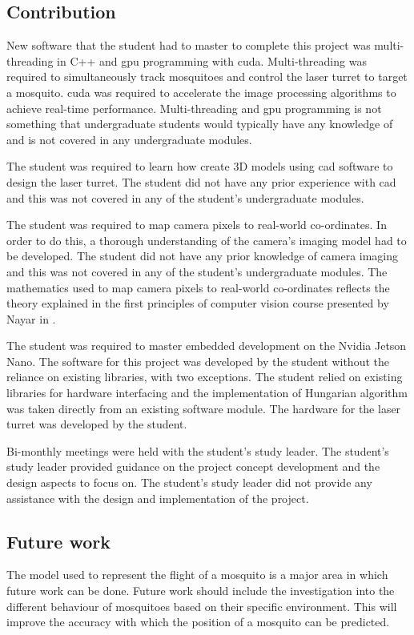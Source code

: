 \subsection{Contribution}
New software that the student had to master to complete this project was multi-threading in C++ and \gls{gpu} programming with \gls{cuda}. Multi-threading was required to simultaneously track mosquitoes and control the laser turret to target a mosquito. \gls{cuda} was required to accelerate the image processing algorithms to achieve real-time performance. Multi-threading and \gls{gpu} programming is not something that undergraduate students would typically have any knowledge of and is not covered in any undergraduate modules.

The student was required to learn how create 3D models using \gls{cad} software to design the laser turret. The student did not have any prior experience with \gls{cad} and this was not covered in any of the student's undergraduate modules.

The student was required to map camera pixels to real-world co-ordinates. In order to do this, a thorough understanding of the camera's imaging model had to be developed. The student did not have any prior knowledge of camera imaging and this was not covered in any of the student's undergraduate modules. The mathematics used to map camera pixels to real-world co-ordinates reflects the theory explained in the first principles of computer vision course presented by Nayar in \cite{Nayar}.

The student was required to master embedded development on the Nvidia Jetson Nano. The software for this project was developed by the student without the reliance on existing libraries, with two exceptions. The student relied on existing libraries for hardware interfacing and the implementation of Hungarian algorithm was taken directly from an existing software module. The hardware for the laser turret was developed by the student.

Bi-monthly meetings were held with the student's study leader. The student's study leader provided guidance on the project concept development and the design aspects to focus on. The student's study leader did not provide any assistance with the design and implementation of the project.


\subsection{Future work}
The model used to represent the flight of a mosquito is a major area in which future work can be done. Future work should include the investigation into the different behaviour of mosquitoes based on their specific environment. This will improve the accuracy with which the position of a mosquito can be predicted.

